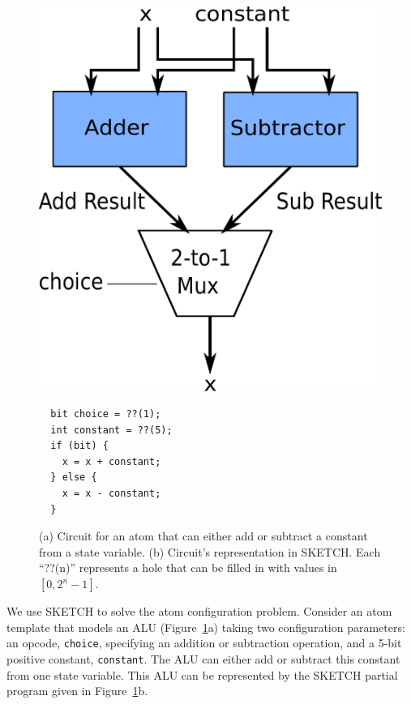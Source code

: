 \begin{figure}[h]
  \begin{minipage}{0.4\columnwidth}
  \begin{center}
  \includegraphics[width=\columnwidth]{circuit.pdf}
  \end{center}
  \end{minipage}
  \begin{minipage}{0.55\columnwidth}
  \begin{center}
  \begin{lstlisting}
  bit choice = ??(1);
  int constant = ??(5);
  if (bit) {
    x = x + constant;
  } else {
    x = x - constant;
  }
  \end{lstlisting}
  \end{center}
  \end{minipage}
\caption{\small (a) Circuit for an atom that can either add or subtract a
constant from a state variable.  (b) Circuit's representation in SKETCH.
Each ``??(n)'' represents a hole that can be filled in with values in
  $[0, 2^n -1]$.}
\label{fig:alu_in_sketch}
\end{figure}

We use SKETCH to solve the atom configuration problem.  Consider an atom
template that models an ALU (Figure~\ref{fig:alu_in_sketch}a) taking two
configuration parameters: an opcode, \texttt{choice}, specifying an addition or
subtraction operation, and a 5-bit positive constant, \texttt{constant}.  The
ALU can either add or subtract this constant from one state variable. This ALU
can be represented by the SKETCH partial program given in Figure~\ref{fig:alu_in_sketch}b.

